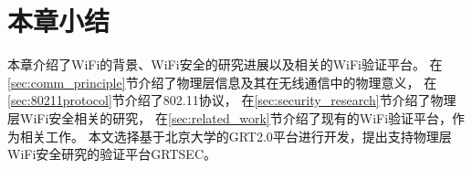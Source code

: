 \section{本章小结}\label{sec:chap2_conclusion}
本章介绍了WiFi的背景、WiFi安全的研究进展以及相关的WiFi验证平台。
在\ref{sec:comm_principle}节介绍了物理层信息及其在无线通信中的物理意义，
在\ref{sec:80211protocol}节介绍了802.11协议，
在\ref{sec:security_research}节介绍了物理层WiFi安全相关的研究，
在\ref{sec:related_work}节介绍了现有的WiFi验证平台，作为相关工作。
本文选择基于北京大学的GRT2.0平台进行开发，提出支持物理层WiFi安全研究的验证平台GRTSEC。
